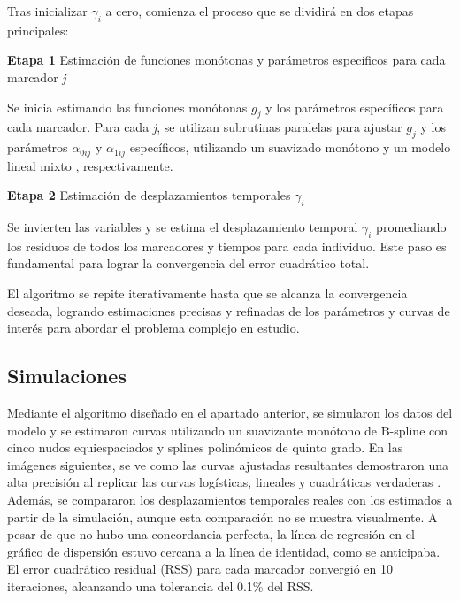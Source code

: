 	Tras inicializar $\gamma_{i}$ a cero, comienza el proceso que se dividirá en dos etapas principales:
	\begin{description}
		\item {\textbf{Etapa 1}} Estimación de funciones monótonas y parámetros específicos para cada marcador \textit{j}
		
		Se inicia estimando las funciones monótonas $g_{j}$	y los parámetros específicos para cada marcador. Para cada \textit{j}, se utilizan subrutinas paralelas para ajustar $g_{j}$
		y los parámetros $\alpha_{0ij}$ y $\alpha_{1ij}$ específicos, utilizando un suavizado monótono \cite{10.1111/1467-9868.00130} y un modelo lineal mixto \cite{bates2010lme4}, respectivamente.
		\item {\textbf{Etapa 2}} Estimación de desplazamientos temporales $\gamma_{i}$
		
		Se invierten las variables y se estima el desplazamiento temporal $\gamma_{i}$ promediando los residuos de todos los marcadores y tiempos para cada individuo. Este paso es fundamental para lograr la convergencia del error cuadrático total.
	\end{description}
	
	El algoritmo se repite iterativamente hasta que se alcanza la convergencia deseada, logrando estimaciones precisas y refinadas de los parámetros y curvas de interés para abordar el problema complejo en estudio.
	
	\subsection{Simulaciones}
	Mediante el algoritmo diseñado en el apartado anterior, se simularon los datos del modelo y se estimaron curvas utilizando un suavizante monótono de B-spline con cinco nudos equiespaciados y splines polinómicos de quinto grado. En las imágenes siguientes, se ve como las curvas ajustadas resultantes demostraron una alta precisión al replicar las curvas logísticas, lineales y cuadráticas verdaderas .\\
	
	Además, se compararon los desplazamientos temporales reales con los estimados a partir de la simulación, aunque esta comparación no se muestra visualmente. A pesar de que no hubo una concordancia perfecta, la línea de regresión en el gráfico de dispersión estuvo cercana a la línea de identidad, como se anticipaba. El error cuadrático residual (RSS) para cada marcador convergió en 10 iteraciones, alcanzando una tolerancia del 0.1\% del RSS.
	
